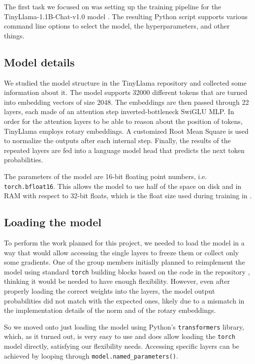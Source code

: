 \documentclass[11pt]{article}
\begin{document}
The first task we focused on was setting up the training pipeline for the TinyLlama-1.1B-Chat-v1.0 model \cite{tinyllamahuggingface}. The resulting Python script supports various command line options to select the model, the hyperparameters, and other things.

\subsection{Model details}

We studied the model structure in the TinyLlama repository \cite{tinyllamarepo} and collected some information about it. The model supports 32000 different tokens that are turned into embedding vectors of size 2048. The embeddings are then passed through 22 layers, each made of an attention step inverted-bottleneck SwiGLU MLP. In order for the attention layers to be able to reason about the position of tokens, TinyLlama employs rotary embeddings. A customized Root Mean Square is used to normalize the outputs after each internal step. Finally, the results of the repeated layers are fed into a language model head that predicts the next token probabilities.

The parameters of the model are 16-bit floating point numbers, i.e. \texttt{torch.bfloat16}. This allows the model to use half of the space on disk and in RAM with respect to 32-bit floats, which is the float size used during training in \cite{tinyllamarepo}.

\subsection{Loading the model}

To perform the work planned for this project, we needed to load the model in a way that would allow accessing the single layers to freeze them or collect only some gradients. One of the group members initially planned to reimplement the model using standard \texttt{torch} building blocks based on the code in the repository \cite{tinyllamarepo}, thinking it would be needed to have enough flexibility. However, even after properly loading the correct weights into the layers, the model output probabilities did not match with the expected ones, likely due to a mismatch in the implementation details of the norm and of the rotary embeddings.

So we moved onto just loading the model using Python's \texttt{transformers} library, which, as it turned out, is very easy to use and does allow loading the \texttt{torch} model directly, satisfying our flexibility needs. Accessing specific layers can be achieved by looping through \texttt{model.named\_parameters()}.
\end{document}
